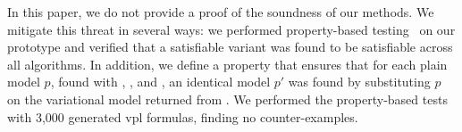 In this paper, we do not provide a proof of the soundness of our methods. We
mitigate this threat in several ways: we performed property-based
testing~\cite{quickcheck} on our prototype and verified that a satisfiable
variant was found to be satisfiable across all algorithms. In addition, we
define a property that ensures that for each plain model $p$, found with
\pTov{}, \vTop{}, and \pTop{}, an identical model $p'$ was found by substituting
$p$ on the variational model returned from \vsat{}. We performed the
property-based tests with 3,000 generated \ac{vpl} formulas, finding no
counter-examples.



